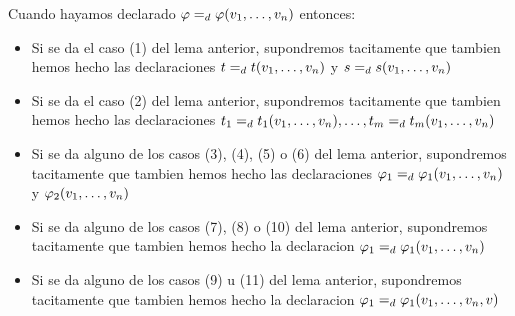 \begin{convention}
  Cuando hayamos declarado $\varphi =_d \varphi(v_{1}, \dots, v_{n})$ entonces:
  \begin{itemize}
    \item Si se da el caso (1) del lema anterior, supondremos tacitamente que tambien hemos hecho las declaraciones $t =_d t(v_{1}, \dots, v_{n})$ y $s =_d s(v_{1}, \dots, v_{n})$
    \item Si se da el caso (2) del lema anterior, supondremos tacitamente que tambien hemos hecho las declaraciones $t_1 =_d t_1(v_{1}, \dots, v_{n}), \dots, t_m =_d t_m(v_{1}, \dots, v_{n})$
    \item Si se da alguno de los casos (3), (4), (5) o (6) del lema anterior, supondremos tacitamente que tambien hemos hecho las declaraciones $\varphi_1 =_d \varphi_1(v_{1}, \dots, v_{n})$ y $\varphi_2(v_{1}, \dots, v_{n})$
    \item Si se da alguno de los casos (7), (8) o (10) del lema anterior, supondremos tacitamente que tambien hemos hecho la declaracion $\varphi_1 =_d \varphi_1(v_{1}, \dots, v_{n})$
    \item Si se da alguno de los casos (9) u (11) del lema anterior, supondremos tacitamente que tambien hemos hecho la declaracion $\varphi_1 =_d \varphi_1(v_{1}, \dots, v_{n}, v)$
  \end{itemize}
\end{convention}

